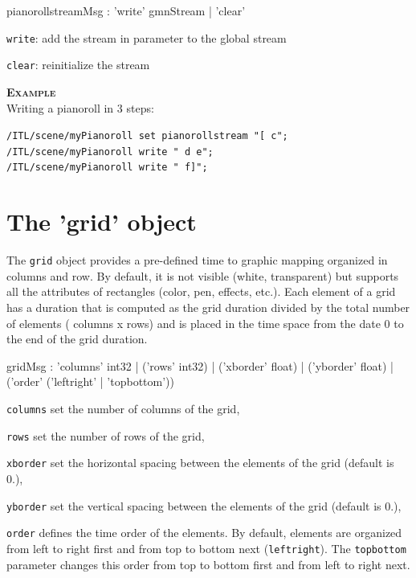 \documentclass[a4paper,twoside]{report}
\newcommand{\sublevel}[1]	{\section{#1}}
\newcommand{\OSC}[1]		{\texttt{#1}}
\newcommand{\example}		{\textbf{\hspace{-1.5cm}\textbf{\textsc{Example }}}}
\let\olditemize\itemize
\let\oldenditemize\enditemize
\renewenvironment{itemize} 	{\olditemize \setlength{\itemsep}{1mm}}{\oldenditemize}
\newcommand{\sample}	[1]			{\vspace{-2mm}\begin{center}\colorbox{mygrey}{
								\begin{minipage}[t]{0.9\columnwidth} 
								{\small \texttt{#1}}
								\end{minipage}}\end{center}}
\begin{document}
\begin{rail}
pianorollstreamMsg :      'write' gmnStream
				| 'clear' 
\end{rail}

\begin{itemize}
\item \OSC{write}: add the stream in parameter to the global stream
\item \OSC{clear}: reinitialize the stream
\end{itemize}


\example \\
Writing a pianoroll in 3 steps:
\sample{/ITL/scene/myPianoroll set pianorollstream "[ c"; \\
/ITL/scene/myPianoroll write " d e";\\
/ITL/scene/myPianoroll write " f]";
}


\sublevel{The 'grid' object}
\label{grid}

The \OSC{grid} object provides a pre-defined time to graphic mapping organized in columns and row. By default, it is not visible (white, transparent) but supports all the attributes of rectangles (color, pen, effects, etc.). Each element of a grid has a duration that is computed as the grid duration divided by the total number of elements ( columns x rows) and is placed in the time space from the date 0 to the end of the grid duration.

\begin{rail}
gridMsg : 'columns' int32
		| ('rows' int32) 
		| ('xborder' float)
		| ('yborder' float)
		| ('order' ('leftright' | 'topbottom'))
\end{rail}

\begin{itemize}
\item \OSC{columns} set the number of columns of the grid,
\item \OSC{rows} set the number of rows of the grid,
\item \OSC{xborder} set the horizontal spacing between the elements of the grid (default is 0.),
\item \OSC{yborder} set the vertical spacing between the elements of the grid (default is 0.),
\item \OSC{order} defines the time order of the elements. By default, elements are organized from left to right first and from top to bottom next (\OSC{leftright}). The \OSC{topbottom} parameter changes this order from top to bottom first and from left to right next.
\end{itemize}
\end{document}
